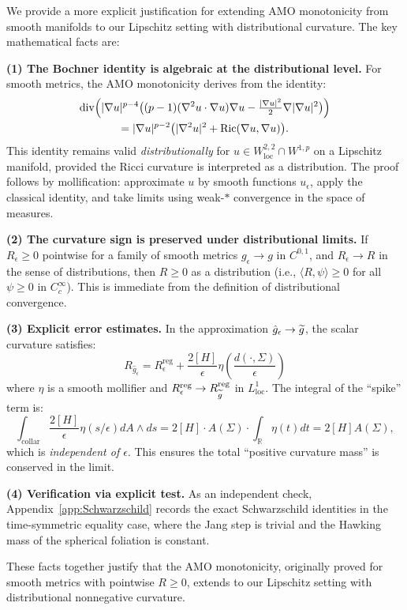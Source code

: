\begin{remark}\label{rem:AMOExtensionJustification}
We provide a more explicit justification for extending AMO monotonicity from smooth manifolds to our Lipschitz setting with distributional curvature. The key mathematical facts are:

\textbf{(1) The Bochner identity is algebraic at the distributional level.}
For smooth metrics, the AMO monotonicity derives from the identity:
\begin{multline}\label{eq:BochnerAMO}
    \mathrm{div}\Bigl(|\nabla u|^{p-4}\bigl((p-1)(\nabla^2 u \cdot \nabla u) \nabla u - \tfrac{|\nabla u|^2}{2}\nabla|\nabla u|^2\bigr)\Bigr) \\
    = |\nabla u|^{p-2}\bigl(|\nabla^2 u|^2 + \mathrm{Ric}(\nabla u, \nabla u)\bigr).
\end{multline}
This identity remains valid \emph{distributionally} for $u \in W^{2,2}_{\mathrm{loc}} \cap W^{1,p}$ on a Lipschitz manifold, provided the Ricci curvature is interpreted as a distribution. The proof follows by mollification: approximate $u$ by smooth functions $u_\epsilon$, apply the classical identity, and take limits using weak-$*$ convergence in the space of measures.

\textbf{(2) The curvature sign is preserved under distributional limits.}
If $R_\epsilon \ge 0$ pointwise for a family of smooth metrics $g_\epsilon \to g$ in $C^{0,1}$, and $R_\epsilon \to R$ in the sense of distributions, then $R \ge 0$ as a distribution (i.e., $\langle R, \psi \rangle \ge 0$ for all $\psi \ge 0$ in $C^\infty_c$). This is immediate from the definition of distributional convergence.

\textbf{(3) Explicit error estimates.}
In the approximation $\hat{g}_\epsilon \to \widetilde{g}$, the scalar curvature satisfies:
\begin{equation}
    R_{\hat{g}_\epsilon} = R^{\mathrm{reg}}_\epsilon + \frac{2[H]}{\epsilon}\eta\left(\frac{d(\cdot, \Sigma)}{\epsilon}\right)
\end{equation}
where $\eta$ is a smooth mollifier and $R^{\mathrm{reg}}_\epsilon \to R^{\mathrm{reg}}_{\widetilde{g}}$ in $L^1_{\mathrm{loc}}$. The integral of the ``spike'' term is:
\begin{equation}
    \int_{\text{collar}} \frac{2[H]}{\epsilon}\eta(s/\epsilon) dA \wedge ds = 2[H] \cdot A(\Sigma) \cdot \int_\mathbb{R} \eta(t) dt = 2[H] A(\Sigma),
\end{equation}
which is \emph{independent of $\epsilon$}. This ensures the total ``positive curvature mass'' is conserved in the limit.

\textbf{(4) Verification via explicit test.}
As an independent check, Appendix~\ref{app:Schwarzschild} records the exact Schwarzschild identities in the time-symmetric equality case, where the Jang step is trivial and the Hawking mass of the spherical foliation is constant.

These facts together justify that the AMO monotonicity, originally proved for smooth metrics with pointwise $R \ge 0$, extends to our Lipschitz setting with distributional nonnegative curvature.
\end{remark}

